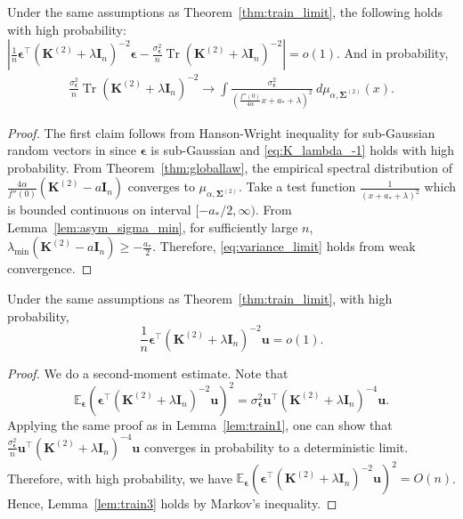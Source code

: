 \documentclass[twoside,11pt]{article}
\newcommand{\bepsilon}{\boldsymbol{\epsilon}}
\newcommand{\E}{\mathbb{E}}
\def\bI{{\mathbf I}}
\def\bK{{\boldsymbol K}}
\def\bu{{\boldsymbol u}}
\def\bSigma{{\boldsymbol \Sigma}}
\renewcommand{\bK}{\boldsymbol{K}}
\newcommand{\Tr}{\operatorname{Tr}}
\newcommand{\1}{\mathbf{1}}
\begin{document}
\begin{lemma}\label{lem:train2}
Under the same assumptions as Theorem~\ref{thm:train_limit},  the following  holds with high probability:
 $ \left| \frac{1}{n}\bepsilon^\top(\bK^{(2)} +\lambda\bI_n)^{-2}\bepsilon- \frac{\sigma_{\bepsilon}^2}{n}\Tr(\bK^{(2)} +\lambda\bI_n)^{-2}\right|=o(1)$.
And   in probability,
  \begin{align}\label{eq:variance_limit}
      \frac{\sigma_{\bepsilon}^2}{n}\Tr(\bK^{(2)} +\lambda\bI_n)^{-2}\to  \int \frac{\sigma_{\bepsilon}^2}{\left(\frac{f''(0)}{4\alpha}x+a_*+\lambda\right)^2}~d\mu_{\alpha,\bSigma^{(2)}}(x).
  \end{align}

\end{lemma}




\begin{proof}
    The first claim follows from Hanson-Wright inequality for sub-Gaussian random vectors in \citep{rudelson2013hanson} since $\bepsilon$ is sub-Gaussian and \eqref{eq:K_lambda_-1} holds with high probability. From Theorem~\ref{thm:globallaw},
    the empirical spectral distribution of $\frac{4\alpha}{f''(0)}(\bK^{(2)}-a\bI_n)$ converges to $\mu_{\alpha,\bSigma^{(2)}}$.  Take a test function $\frac{1}{(x+a_*+\lambda)^2}$ which is bounded continuous on interval $[-a_*/2,\infty)$. From Lemma~\ref{lem:asym_sigma_min}, for sufficiently large $n$, $\lambda_{\min} (\bK^{(2)}-a\bI_n)\geq -\frac{a_*}{2}$. Therefore, \eqref{eq:variance_limit} holds from weak convergence.
\end{proof}


\begin{lemma}\label{lem:train3}
Under the same assumptions as Theorem~\ref{thm:train_limit}, with high probability, 
    $$\frac{1}{n}\bepsilon^\top(\bK^{(2)} +\lambda\bI_n)^{-2}\bu =o(1).$$
\end{lemma}
\begin{proof}
    We do a second-moment estimate. Note that
  $$
        \E_{\bepsilon} \left(\bepsilon^\top(\bK^{(2)} +\lambda\bI_n)^{-2}\bu\right)^2=\sigma_{\bepsilon}^2\bu^\top (\bK^{(2)} +\lambda\bI_n)^{-4}\bu.$$
Applying the same proof as in Lemma~\ref{lem:train1}, one can show that 
$\frac{\sigma_{\bepsilon}^2}{n}\bu^\top (\bK^{(2)} +\lambda\bI_n)^{-4}\bu$  
converges in probability to a deterministic limit. Therefore, with high probability, we have 
$\E_{\bepsilon} \left(\bepsilon^\top(\bK^{(2)} +\lambda\bI_n)^{-2}\bu\right)^2=O(n)$.
Hence, Lemma~\ref{lem:train3} holds by Markov's inequality.
\end{proof}
\end{document}
